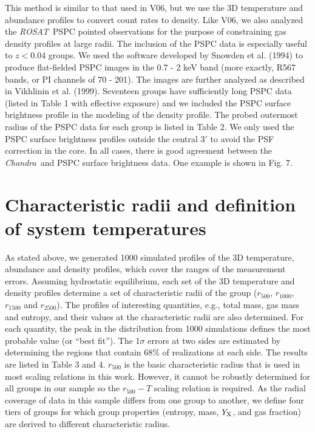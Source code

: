 \documentclass{aastex}
\def\chandra    {{\em Chandra}\/}
\def\rosat      {{\em ROSAT}\/}
\begin{document}
This method is similar to that used in V06, but we use the 3D temperature and abundance
profiles to convert count rates to density. Like V06,
we also analyzed the \rosat\ PSPC pointed observations for the purpose of constraining
gas density profiles at large radii. The inclusion of the PSPC data is especially
useful to $z<0.04$ groups. We used the software developed by Snowden et al.
(1994) to produce flat-fielded PSPC images in the 0.7 - 2 keV band (more exactly, R567
bands, or PI channels of 70 - 201). The images are further analyzed as described in
Vikhlinin et al. (1999).
Seventeen groups have sufficiently long PSPC data (listed in Table 1 with effective exposure)
and we included the PSPC surface brightness profile in the modeling of the density profile.
The probed outermost radius of the PSPC data for each group is listed in Table 2.
We only used the PSPC surface brightness profiles outside the central
3$'$ to avoid the PSF correction in the core. In all cases, there is good
agreement between the \chandra\ and PSPC surface brightness data.
One example is shown in Fig. 7.

\section{Characteristic radii and definition of system temperatures}

As stated above, we generated 1000 simulated profiles of the 3D temperature,
abundance and density profiles, which cover the ranges of the measurement errors.
Assuming hydrostatic equilibrium,
each set of the 3D temperature and density profiles determine a set of characteristic
radii of the group ($r_{500}$,
$r_{1000}$, $r_{1500}$ and $r_{2500}$). The profiles of interesting quantities, e.g., total
mass, gas mass and entropy, and their values at the characteristic radii are also
determined. For each quantity, the peak in the distribution from 1000 simulations
defines the most probable value (or ``best fit''). The 1$\sigma$ errors at two sides
are estimated by determining the regions that contain 68\% of realizations at each side.
The results are listed in Table 3 and 4.
$r_{500}$ is the basic characteristic radius that is used in most scaling relations in
this work. However, it cannot be robustly determined for all groups in our sample so
the $r_{500} - T$ scaling relation is required.
As the radial coverage of data in this sample differs from one group to
another, we define four tiers of groups for which group properties (entropy, mass,
$Y_{\rm X}$, and gas fraction) are derived to different characteristic radius.
\end{document}
